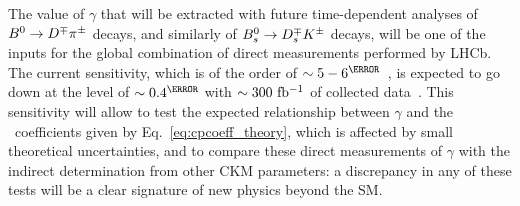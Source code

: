The value of $\gamma$ that will be extracted with future time-dependent analyses of $B^0\rightarrow D^\mp\pi^\pm$ decays, and similarly of $B^0_s\rightarrow D_{s}^{\mp} K^{\pm}$ decays,
will be one of the inputs for the global combination of direct measurements performed by LHCb. The current sensitivity, which is of the order
of $\sim 5-6^\degree$~\cite{Aaij:2016kjh}, is expected to go down at the level of $\sim 0.4^\degree$ with $\sim 300~\rm fb^{-1}$ of collected 
data~\cite{CERN-LHCC-2017-003}. 
This sensitivity will allow to test the expected relationship between $\gamma$ and the \CP~coefficients 
given by Eq.~\ref{eq:cpcoeff_theory}, which is affected by small theoretical uncertainties,  
and to compare these direct measurements of $\gamma$ with the indirect determination from other CKM parameters: a discrepancy in any of these tests
will be a clear signature of new physics beyond the SM.
